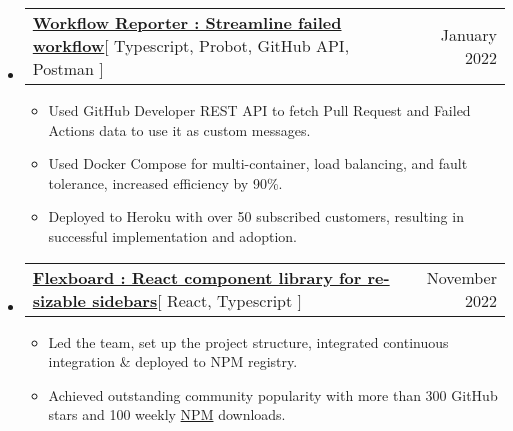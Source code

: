 \documentclass[letterpaper,11pt]{article}
\makeatletter
\newcommand{\resumeItem}[1]{
  \item\small{
    {#1 \vspace{-2pt}}
  }
}
\newcommand{\resumeProjectHeading}[2]{
    \item
    \begin{tabular*}{0.97\textwidth}{l@{\extracolsep{\fill}}r}
      \small#1 & #2 \\
    \end{tabular*}\vspace{-7pt}
}
\newcommand{\resumeSubHeadingListStart}{\begin{itemize}[leftmargin=0.15in, label={}]}
\newcommand{\resumeSubHeadingListEnd}{\end{itemize}}
\newcommand{\resumeItemListStart}{\begin{itemize}}
\newcommand{\resumeItemListEnd}{\end{itemize}\vspace{-5pt}}
\makeatother
\begin{document}
    \resumeSubHeadingListStart
      \resumeProjectHeading
          {\textbf{\href{https://github.com/marketplace/workflow-reporter}{Workflow Reporter : Streamline failed workflow}}{[ Typescript, Probot, GitHub API, Postman ]}}{January 2022}
          \resumeItemListStart
           \resumeItem{Used GitHub Developer REST API to fetch Pull Request and Failed Actions data to use it as custom messages.}
           \resumeItem{Used Docker Compose for multi-container, load balancing, and fault tolerance, increased efficiency by 90\%.}
           \resumeItem{Deployed to Heroku with over 50 subscribed customers, resulting in successful implementation and adoption.}
          \resumeItemListEnd
    \resumeSubHeadingListEnd



    \resumeSubHeadingListStart
      \resumeProjectHeading
          {\textbf{\href{https://github.com/dorbus/flexboard}{Flexboard : React component library for re-sizable sidebars}}{[ React, Typescript ]}}{November 2022}
          \resumeItemListStart
            \resumeItem{Led the team, set up the project structure, integrated continuous integration \& deployed to NPM registry.}
            \resumeItem{Achieved outstanding community popularity with more than 300 GitHub stars and 100 weekly \href{https://www.npmjs.com/package/@dorbus/flexboard}{NPM} downloads.}
          \resumeItemListEnd
    \resumeSubHeadingListEnd
\end{document}
